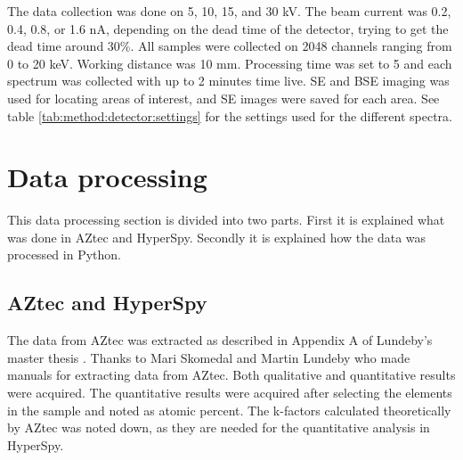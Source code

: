The data collection was done on 5, 10, 15, and 30 kV.
The beam current was 0.2, 0.4, 0.8, or 1.6 nA, depending on the dead time of the detector, trying to get the dead time around 30\%.
All samples were collected on 2048 channels ranging from 0 to 20 keV.
Working distance was 10 mm.
Processing time was set to 5 and each spectrum was collected with up to 2 minutes time live.
SE and BSE imaging was used for locating areas of interest, and SE images were saved for each area.
See table \cref{tab:method:detector:settings} for the settings used for the different spectra.


%
%
\section{Data processing}
\label{sec:method:data_processing}

This data processing section is divided into two parts.
First it is explained what was done in AZtec and HyperSpy.
Secondly it is explained how the data was processed in Python.

\subsection{AZtec and HyperSpy}
\label{sec:method:data_processing:aztec_hyperspy}

The data from AZtec was extracted as described in Appendix A of Lundeby's master thesis \cite{lundeby_improving_2019}.
Thanks to Mari Skomedal \cite{skomedal_improving_2022} and Martin Lundeby \cite{lundeby_improving_2019} who made manuals for extracting data from AZtec.
Both qualitative and quantitative results were acquired.
The quantitative results were acquired after selecting the elements in the sample and noted as atomic percent.
The k-factors calculated theoretically by AZtec was noted down, as they are needed for the quantitative analysis in HyperSpy.

